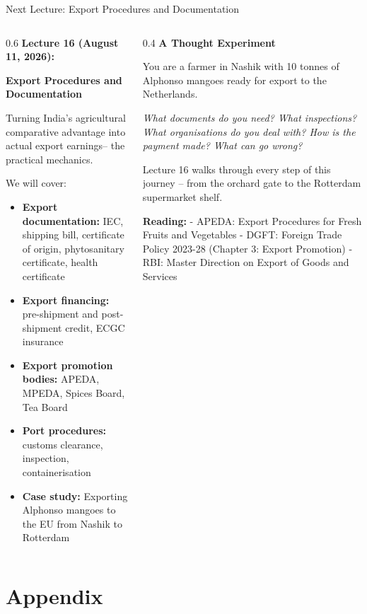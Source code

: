 \documentclass[
  ignorenonframetext,
  aspectratio=169,
]{beamer}
\makeatletter
\providecommand{\tightlist}{%
  \setlength{\itemsep}{0pt}\setlength{\parskip}{0pt}}
\let\quarto@originallabel\label
\DeclareRobustCommand*{\label}[1]{\quarto@originallabel{#1}}
\makeatother
\begin{document}
\begin{frame}{Next Lecture: Export Procedures and Documentation}
\label{next-lecture-export-procedures-and-documentation}
\begin{columns}[T]
\begin{column}{0.6\linewidth}
\textbf{Lecture 16 (August 11, 2026):}

\textbf{Export Procedures and Documentation}

Turning India's agricultural comparative advantage into actual export
earnings-- the practical mechanics.

We will cover:

\begin{itemize}
\tightlist
\item
  \textbf{Export documentation:} IEC, shipping bill, certificate of
  origin, phytosanitary certificate, health certificate
\item
  \textbf{Export financing:} pre-shipment and post-shipment credit, ECGC
  insurance
\item
  \textbf{Export promotion bodies:} APEDA, MPEDA, Spices Board, Tea
  Board
\item
  \textbf{Port procedures:} customs clearance, inspection,
  containerisation
\item
  \textbf{Case study:} Exporting Alphonso mangoes to the EU from Nashik
  to Rotterdam
\end{itemize}
\end{column}

\begin{column}{0.4\linewidth}
\textbf{A Thought Experiment}

You are a farmer in Nashik with 10 tonnes of Alphonso mangoes ready for
export to the Netherlands.

\emph{What documents do you need? What inspections? What organisations
do you deal with? How is the payment made? What can go wrong?}

Lecture 16 walks through every step of this journey -- from the orchard
gate to the Rotterdam supermarket shelf.

\textbf{Reading:} - APEDA: Export Procedures for Fresh Fruits and
Vegetables - DGFT: Foreign Trade Policy 2023-28 (Chapter 3: Export
Promotion) - RBI: Master Direction on Export of Goods and Services
\end{column}
\end{columns}
\end{frame}

\section{Appendix}\label{appendix}
\end{document}
